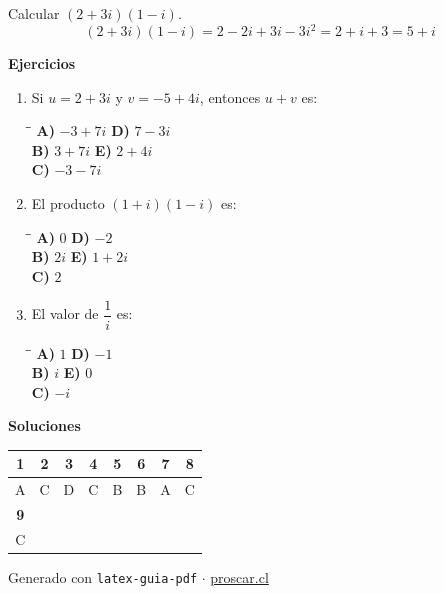\documentclass[11pt,a4paper]{article}
\begin{document}
\begin{cajae}
Calcular $(2+3i)(1-i)$.
\[ (2+3i)(1-i)=2-2i+3i-3i^2=2+i+3=5+i \]
\end{cajae}

\textbf{Ejercicios}

\begin{multicols}{2}
\begin{enumerate}[label=\textbf{\arabic*.},start=7]
\item Si $u=2+3i$ y $v=-5+4i$, entonces $u+v$ es:
\begin{tabbing}
\hspace{0.5cm}\=\hspace{3.5cm}\=\kill
\textbf{A)} $-3+7i$ \> \textbf{D)} $7-3i$ \\
\textbf{B)} $3+7i$ \> \textbf{E)} $2+4i$ \\
\textbf{C)} $-3-7i$ \\
\end{tabbing}
\item El producto $(1+i)(1-i)$ es:
\begin{tabbing}
\hspace{0.5cm}\=\hspace{3.5cm}\=\kill
\textbf{A)} $0$ \> \textbf{D)} $-2$ \\
\textbf{B)} $2i$ \> \textbf{E)} $1+2i$ \\
\textbf{C)} $2$ \\
\end{tabbing}
\item El valor de $\dfrac{1}{i}$ es:
\begin{tabbing}
\hspace{0.5cm}\=\hspace{3.5cm}\=\kill
\textbf{A)} $1$ \> \textbf{D)} $-1$ \\
\textbf{B)} $i$ \> \textbf{E)} $0$ \\
\textbf{C)} $-i$ \\
\end{tabbing}
\end{enumerate}
\end{multicols}

\vspace{4mm}
\vspace{4mm}
\begin{center}\textbf{Soluciones}\end{center}
\begin{center}
\begin{tabular}{|c|c|c|c|c|c|c|c|}
\hline
\textbf{1} & \textbf{2} & \textbf{3} & \textbf{4} & \textbf{5} & \textbf{6} & \textbf{7} & \textbf{8} \\
\hline
A & C & D & C & B & B & A & C \\
\hline
\textbf{9} \\
\hline
C \\
\hline
\end{tabular}
\end{center}

\vfill
\begin{center}\small\color{gris}Generado con \texttt{latex-guia-pdf} $\cdot$ \href{https://proscar.cl}{proscar.cl}\end{center}
\end{document}
